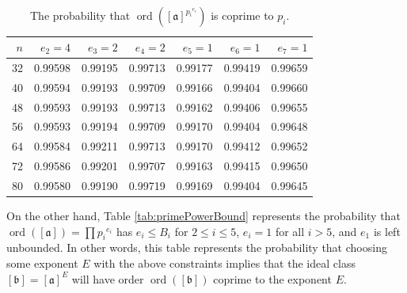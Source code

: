 \documentclass{ucalgthes1}
\theoremstyle{definition}
\DeclareMathOperator{\ord}{ord}
\newcommand{\ideal}{\mathfrak}
\newcommand{\idealclass}[1]{\left[ \ideal #1 \right]}
\newcommand{\aclass}{\idealclass a}
\newcommand{\bclass}{\idealclass b}
\begin{document}
\begin{table}[htb]
\centering
\begin{tabular}{| r | r | r | r | r | r | r |}
	\hline
	$n$ & $e_2 = 4$ & $e_3 = 2$ & $e_4 = 2$ & $e_5 = 1$ & $e_6 = 1$ & $e_7 = 1$ \\
	\hline
32 & 0.99598 & 0.99195 & 0.99713 & 0.99177 & 0.99419 & 0.99659 \\
40 & 0.99594 & 0.99193 & 0.99709 & 0.99166 & 0.99404 & 0.99660 \\
48 & 0.99593 & 0.99193 & 0.99713 & 0.99162 & 0.99406 & 0.99655 \\
56 & 0.99593 & 0.99194 & 0.99709 & 0.99170 & 0.99404 & 0.99648 \\
64 & 0.99584 & 0.99211 & 0.99713 & 0.99170 & 0.99412 & 0.99652 \\
72 & 0.99586 & 0.99201 & 0.99707 & 0.99163 & 0.99415 & 0.99650 \\
80 & 0.99580 & 0.99190 & 0.99719 & 0.99169 & 0.99404 & 0.99645 \\
	\hline
\end{tabular}
\caption{The probability that $\ord(\aclass^{{p_i}^{e_i}})$ is coprime to $p_i$.}
\label{tab:ninetyNine}
\end{table}

On the other hand, Table \ref{tab:primePowerBound} represents the probability that $\ord(\aclass) = \prod {p_i}^{e_i}$ has $e_i \le B_i$ for $2 \le i \le 5$, $e_i = 1$ for all $i > 5$, and $e_1$ is left unbounded.  In other words, this table represents the probability that choosing some exponent $E$ with the above constraints implies that the ideal class $\bclass = \aclass ^ E$ will have order $\ord(\bclass)$ coprime to the exponent $E$.
\end{document}
